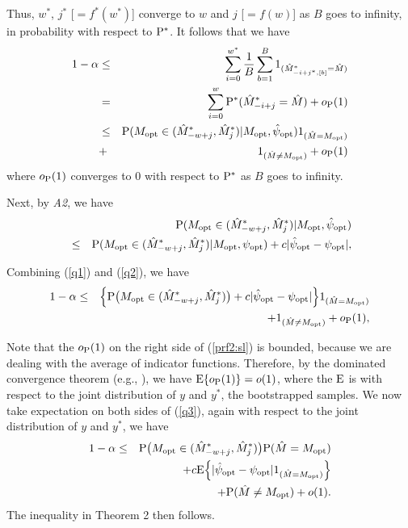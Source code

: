 \documentclass[10pt]{book}
\theoremstyle{definition}
\begin{document}
Thus, $w^*$, $j^*$ [$=f^*(w^*)$] converge to $w$ and $j$ [$=f(w)$] as $B$ goes to infinity, in probability with respect to ${\rm P^*}$.
It follows that we have
\begin{eqnarray}
 1-\alpha &\leq & \sum_{i=0}^{w^*}\frac{1}{B}\sum_{b=1}^B 1_{(\hat{M}^*_{-i+j^*,[b]}=\hat{M} )}\nonumber\\
 &=& \sum_{i=0}^{w}{\rm P^*}(\hat{M}^*_{-i+j}=\hat{M})+o_{\rm P}(1)\nonumber\\
 &\leq& {\rm P}(M_{\rm opt} \in (\hat{M}^*_{-w+j}, \hat{M}^*_{j})|M_{\rm opt},\hat{\psi}_{\rm opt})1_{(\hat{M}=M_{\rm opt})} \nonumber \\
 &+&1_{(\hat{M}\neq M_{\rm opt})}+o_{\rm P}(1)\label{q1}
\end{eqnarray}
where $o_{\rm P}(1)$ converges to $0$ with respect to ${\rm P}^*$ as $B$ goes to infinity. 

Next, by {\it A2}, we have
\begin{eqnarray}
&&{\rm P}(M_{\rm opt}\in(\hat{M}_{-w+j}^{*},\hat{M}_{j}^{*})|M_{\rm opt},\hat{\psi}_{\rm
 opt})\nonumber\\
 &\leq&{\rm P}(M_{\rm opt}\in(\hat{M}_{-w+j}^{*},\hat{M}_{j}^{*})|M_{\rm opt},\psi_{\rm
opt})+ c|\hat{\psi}_{\rm opt}-\psi_{\rm opt}|\label{q2},
\end{eqnarray}

Combining (\ref{q1}) and (\ref{q2}), we have
\begin{eqnarray}
\label{prf2:sl}
 1-\alpha &\leq & \Big\{{\rm P}\big(M_{\rm opt}\in(\hat{M}_{-w+j}^{*},\hat{M}_{j}^{*})\big)+c|\hat{\psi}_{\rm opt}-\psi_{\rm opt}|\Big\}1_{(\hat{M}=M_{\rm opt})} \nonumber\\
 &&+ 1_{(\hat{M}\neq M_{\rm opt})}+o_{\rm P}(1),\label{q3}
\end{eqnarray}

Note that the $o_{\rm P}(1)$ on the right side of (\ref{prf2:sl}) is bounded, because we are dealing with the average of indicator functions. Therefore, by the dominated convergence theorem (e.g., \citet[Theorem 2.16]{jiang}), we have ${\rm E}\{o_{\rm P}(1)\} = o(1)$, where the ${\rm E}$ is with respect to the joint distribution of $y$ and $y^*$, the bootstrapped samples. We now take expectation on both sides of (\ref{q3}), again with respect to the joint distribution of $y$ and $y^*$, we have
\begin{eqnarray}
 1-\alpha &\leq & {\rm P}\big(M_{\rm opt}\in(\hat{M}_{-w+j}^{*},\hat{M}_{j}^{*})\big){\rm P}(\hat{M}=M_{\rm opt})\nonumber\\
 &&+c{\rm E}\Big\{|\hat{\psi}_{\rm opt}-\psi_{\rm opt}|1_{(\hat{M}=M_{\rm opt})} \Big\}\nonumber\\
 &&+ {\rm P}(\hat{M}\neq M_{\rm opt})+o(1).
\end{eqnarray}
The inequality in Theorem 2 then follows.
\end{document}
